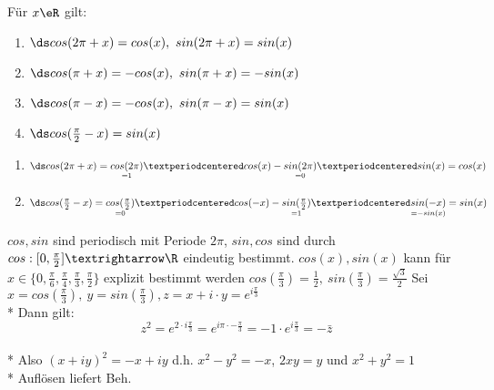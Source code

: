 Für $x\eR$ gilt:
\begin{enumerate}
\item{$\ds cos(2\pi+x)=cos(x),\ sin(2\pi+x)=sin(x)$}
\item{$\ds cos(\pi+x)=-cos(x),\ sin(\pi+x)=-sin(x)$}
\item{$\ds cos(\pi-x)=-cos(x),\ sin(\pi-x)=sin(x)$}
\item{$\ds cos(\frac{\pi}{2}-x)=sin(x)$}
\end{enumerate}
\begin{enumerate}
\item{$\ds cos(2\pi+x)=\underset{=1}{cos(2\pi)}·cos(x)-\underset{=0}{sin(2\pi)}·sin(x)=cos(x)$}
\setcounter{enumi}{3}
\item{$\ds cos(\frac{\pi}{2}-x)=\underset{=0}{cos(\frac{\pi}{2})}·cos(-x)-\underset{=1}{sin(\frac{\pi}{2})}·\underset{=-sin(x)}{sin(-x)}=sin(x)$}
\end{enumerate}
\bem
$cos,sin$ sind periodisch mit Periode $2\pi$, $sin,cos$ sind durch $cos:[0,\frac{\pi}{2}]→\R$ eindeutig bestimmt.
\bem
$cos(x),sin(x)$ kann für $x\in \{0,\frac{\pi}{6},\frac{\pi}{4},\frac{\pi}{3},\frac{\pi}{2}\}$ explizit bestimmt werden
\bsp
$cos(\frac{\pi}{3})=\frac{1}{2},\ sin(\frac{\pi}{3})=\frac{\sqrt{3}}{2}$
\bew
	Sei $x = cos (\frac{\pi}{3}),\ y = sin(\frac{\pi}{3}), z = x + i\cdot y = e^{i\frac{\pi}{3}}$\\*
	Dann gilt:
	$$z^2 = e^{2 \cdot i\frac{\pi}{3}} = e^{i\pi \cdot - \frac{\pi}{3}} = -1 \cdot e^{i\frac{\pi}{3}} = -\bar{z}$$\\*
	Also $(x + iy)^2 = -x + iy$ d.h. $x^2 - y^2 = -x$, $2xy = y$ und $x^2 + y^2 = 1$\\*
	Auflösen liefert Beh.